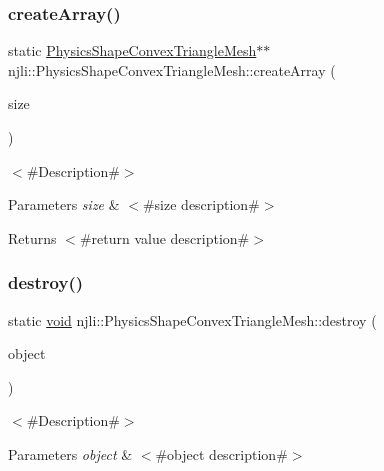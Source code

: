 \subsubsection{\texorpdfstring{create\+Array()}{createArray()}}
{\footnotesize\ttfamily static \mbox{\hyperlink{classnjli_1_1_physics_shape_convex_triangle_mesh}{Physics\+Shape\+Convex\+Triangle\+Mesh}}$\ast$$\ast$ njli\+::\+Physics\+Shape\+Convex\+Triangle\+Mesh\+::create\+Array (\begin{DoxyParamCaption}\item[{const \mbox{\hyperlink{_util_8h_a10e94b422ef0c20dcdec20d31a1f5049}{u32}}}]{size }\end{DoxyParamCaption})\hspace{0.3cm}{\ttfamily [static]}}

$<$\#\+Description\#$>$


\begin{DoxyParams}{Parameters}
{\em size} & $<$\#size description\#$>$\\
\hline
\end{DoxyParams}
\begin{DoxyReturn}{Returns}
$<$\#return value description\#$>$ 
\end{DoxyReturn}
\mbox{\label{classnjli_1_1_physics_shape_convex_triangle_mesh_aa5c6e79a23fc865fc1f1bef9a943fafc}} 
\subsubsection{\texorpdfstring{destroy()}{destroy()}}
{\footnotesize\ttfamily static \mbox{\hyperlink{_thread_8h_af1e856da2e658414cb2456cb6f7ebc66}{void}} njli\+::\+Physics\+Shape\+Convex\+Triangle\+Mesh\+::destroy (\begin{DoxyParamCaption}\item[{\mbox{\hyperlink{classnjli_1_1_physics_shape_convex_triangle_mesh}{Physics\+Shape\+Convex\+Triangle\+Mesh}} $\ast$}]{object }\end{DoxyParamCaption})\hspace{0.3cm}{\ttfamily [static]}}

$<$\#\+Description\#$>$


\begin{DoxyParams}{Parameters}
{\em object} & $<$\#object description\#$>$ \\
\hline
\end{DoxyParams}
\mbox{\label{classnjli_1_1_physics_shape_convex_triangle_mesh_a6459cef88563e5ec60b75087e92df163}} 
